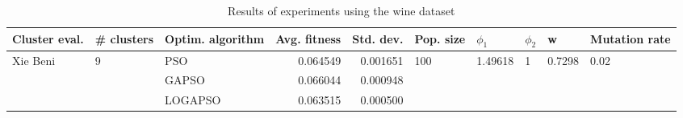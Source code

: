 \begin{table}
\centering
\caption{Results of experiments using the wine dataset}
\begin{tabular}{lllrrlllll}
\toprule
            Cluster eval. &        \# clusters & Optim. algorithm &  Avg. fitness &  Std. dev. &            Pop. size &               $\phi_{1}$ &         $\phi_{2}$ &                       w &         Mutation rate \\
\midrule
\multirow{3}{*}{Xie Beni} & \multirow{3}{*}{9} &              PSO &      0.064549 &   0.001651 & \multirow{3}{*}{100} & \multirow{3}{*}{1.49618} & \multirow{3}{*}{1} & \multirow{3}{*}{0.7298} & \multirow{3}{*}{0.02} \\
                          &                    &            GAPSO &      0.066044 &   0.000948 &                      &                          &                    &                         &                       \\
                          &                    &          LOGAPSO &      0.063515 &   0.000500 &                      &                          &                    &                         &                       \\
\bottomrule
\end{tabular}
\end{table}
